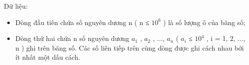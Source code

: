 Dữ liệu:
\begin{itemize}
	\item Dòng đầu tiên chứa số nguyên dương n ( n ≤ $10^{6}$ ) là số lượng ô của băng số;
	\item Dòng thứ hai chứa n số nguyên dương $a_{1}$ , $a_{2}$ , ..., $a_{n}$ ( $a_{i}$ ≤ $10^{4}$ , i = 1, 2, ..., n ) ghi trên băng số. Các số liên tiếp trên cùng dòng được ghi cách nhau bởi ít nhất một dấu cách.
\end{itemize}
